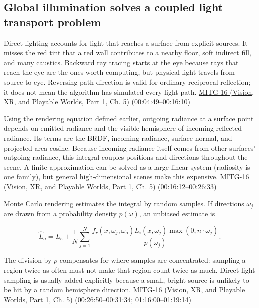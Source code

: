 \subsection{Global illumination solves a coupled light transport problem}\label{03-visual-computing-i-ch011-global-illumination-solves-a-coupled-light-transport-problem}

\hypertarget{03-visual-computing-i-ch011-global-illumination-solves-a-coupled-light-transport-problem}{}

Direct lighting accounts for light that reaches a surface from explicit sources. It misses the red tint that a red wall contributes to a nearby floor, soft indirect fill, and many caustics. Backward ray tracing starts at the eye because rays that reach the eye are the ones worth computing, but physical light travels from source to eye. Reversing path direction is valid for ordinary reciprocal reflection; it does not mean the algorithm has simulated every light path. \href{../07-Vision-XR-and-Playable-Worlds-P01/main.pdf\#nameddest=04-visual-computing-ii-ch036-mitg-16---global-illumination}{MITG-16 (Vision, XR, and Playable Worlds, Part 1, Ch. 5)} (00:04:49--00:16:10)

Using the rendering equation defined earlier, outgoing radiance at a surface point depends on emitted radiance and the visible hemisphere of incoming reflected radiance. Its terms are the BRDF, incoming radiance, surface normal, and projected-area cosine. Because incoming radiance itself comes from other surfaces' outgoing radiance, this integral couples positions and directions throughout the scene. A finite approximation can be solved as a large linear system (radiosity is one family), but general high-dimensional scenes make this expensive. \href{../07-Vision-XR-and-Playable-Worlds-P01/main.pdf\#nameddest=04-visual-computing-ii-ch036-mitg-16---global-illumination}{MITG-16 (Vision, XR, and Playable Worlds, Part 1, Ch. 5)} (00:16:12--00:26:33)

Monte Carlo rendering estimates the integral by random samples. If directions \(\omega_j\) are drawn from a probability density \(p(\omega)\), an unbiased estimate is

\[
\widehat L_o=L_e+\frac1N\sum_{j=1}^{N}\frac{f_r(x,\omega_j,\omega_o)L_i(x,\omega_j)\max(0,n\cdot\omega_j)}{p(\omega_j)}.
\]

The division by \(p\) compensates for where samples are concentrated: sampling a region twice as often must not make that region count twice as much. Direct light sampling is usually added explicitly because a small, bright source is unlikely to be hit by a random hemisphere direction. \href{../07-Vision-XR-and-Playable-Worlds-P01/main.pdf\#nameddest=04-visual-computing-ii-ch036-mitg-16---global-illumination}{MITG-16 (Vision, XR, and Playable Worlds, Part 1, Ch. 5)} (00:26:50--00:31:34; 01:16:00--01:19:14)

